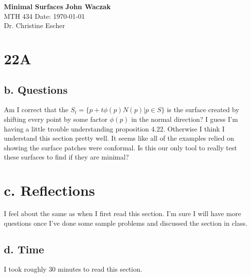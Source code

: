 \documentclass[a4paper, 11pt]{article}
\begin{document}
\noindent
\large\textbf{Minimal Surfaces} \hfill \textbf{John Waczak} \\
\normalsize MTH 434 \hfill  Date: \today \\
Dr. Christine Escher \\

\section*{22A}
	\subsection*{b. Questions}
	 
	 Am I correct that the $S_t = \{p + t\phi(p)N(p) | p \in S\}$ is the surface created by shifting every point by some factor $\phi(p)$ in the normal direction? I guess I'm having a little trouble understanding proposition 4.22. Otherwise I think I understand this section pretty well. It seems like all of the examples relied on showing the surface patches were conformal. Is this our only tool to really test these surfaces to find if they are minimal? 
	
	\section*{c. Reflections}
	I feel about the same as when I first read this section. I'm sure I will have more questions once I've done some sample problems and discussed the section in class.
	
	
	\subsection*{d. Time}
	I took roughly 30 minutes to read this section. 
\end{document}
